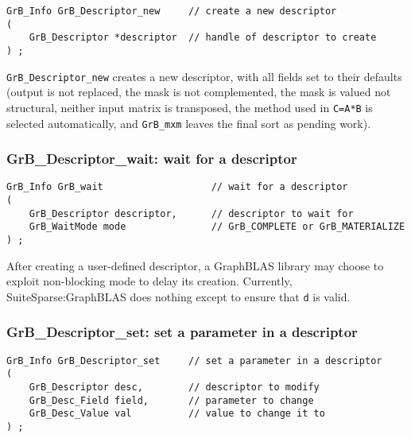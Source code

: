 \documentclass[12pt]{article}
\begin{document}
{\begin{mdframed}[userdefinedwidth=6in]
{\footnotesize
\begin{verbatim}
GrB_Info GrB_Descriptor_new     // create a new descriptor
(
    GrB_Descriptor *descriptor  // handle of descriptor to create
) ;
\end{verbatim} } \end{mdframed}

\verb'GrB_Descriptor_new' creates a new descriptor, with all fields set to
their defaults (output is not replaced, the mask is not complemented, the mask
is valued not structural, neither input matrix is transposed, the method
used in \verb'C=A*B' is selected automatically, and \verb'GrB_mxm' leaves
the final sort as pending work).

\subsubsection{{\sf GrB\_Descriptor\_wait:} wait for a descriptor}
\label{descriptor_wait}

\begin{mdframed}[userdefinedwidth=6in]
{\footnotesize
\begin{verbatim}
GrB_Info GrB_wait                   // wait for a descriptor
(
    GrB_Descriptor descriptor,      // descriptor to wait for
    GrB_WaitMode mode               // GrB_COMPLETE or GrB_MATERIALIZE
) ;
\end{verbatim}
}\end{mdframed}

After creating a user-defined descriptor, a GraphBLAS library may choose to
exploit non-blocking mode to delay its creation.  Currently,
SuiteSparse:GraphBLAS does nothing except to ensure that \verb'd' is valid.

\newpage
\subsubsection{{\sf GrB\_Descriptor\_set:}  set a parameter in a descriptor}
\label{descriptor_set}

\begin{mdframed}[userdefinedwidth=6in]
{\footnotesize
\begin{verbatim}
GrB_Info GrB_Descriptor_set     // set a parameter in a descriptor
(
    GrB_Descriptor desc,        // descriptor to modify
    GrB_Desc_Field field,       // parameter to change
    GrB_Desc_Value val          // value to change it to
) ;
\end{verbatim} } \end{mdframed}

}
\end{document}
